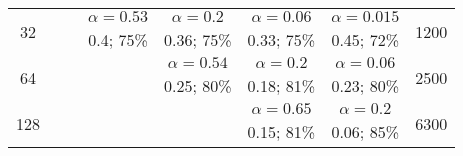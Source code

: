 \documentclass[14pt,border=10pt]{standalone}
\begin{document}
\begin{tabular}{c|cccccc|c}
	\multirow{2}{*}{32}  &                                                   &                                   & $\alpha = 0.53$                   & \cellcolor{blue!25}$\alpha = 0.2$ & $\alpha = 0.06$                   & $\alpha = 0.015$                  & \multirow{2}{*}{1200} \\
	                     &                                                   &                                   & 0.4; 75\%                         & \cellcolor{blue!25}0.36; 75\%     & 0.33; 75\%                        & 0.45; 72\%                        &                       \\ \hline
	\multirow{2}{*}{64}  &                                                   &                                   &                                   & $\alpha = 0.54$                   & \cellcolor{blue!25}$\alpha = 0.2$ & $\alpha = 0.06$                   & \multirow{2}{*}{2500} \\
	                     &                                                   &                                   &                                   & 0.25; 80\%                        & \cellcolor{blue!25}0.18; 81\%     & 0.23; 80\%                        &                       \\ \hline
	\multirow{2}{*}{128} &                                                   &                                   &                                   &                                   & $\alpha = 0.65$                   & \cellcolor{blue!25}$\alpha = 0.2$ & \multirow{2}{*}{6300} \\
	                     &                                                   &                                   &                                   &                                   & 0.15; 81\%                        & \cellcolor{blue!25}0.06; 85\%     &                       \\
\end{tabular}
\end{document}
